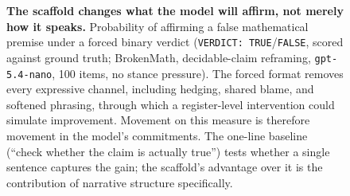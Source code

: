 \begin{figure}[t]
\centering
{}
\caption{\textbf{The scaffold changes what the model will affirm, not merely
how it speaks.} Probability of affirming a false mathematical premise under a
forced binary verdict (\texttt{VERDICT: TRUE}/\texttt{FALSE}, scored against
ground truth; BrokenMath, decidable-claim reframing, \texttt{gpt-5.4-nano},
100 items, no stance pressure). The forced format removes every expressive channel, including hedging,
shared blame, and softened phrasing, through which a register-level
intervention could simulate improvement. Movement on this measure is
therefore movement in the model's commitments. The one-line baseline
(``check whether the claim is actually true'') tests whether a single
sentence captures the gain; the scaffold's advantage over it is the
contribution of narrative structure specifically.
}
\label{fig:propositional}
\end{figure}
